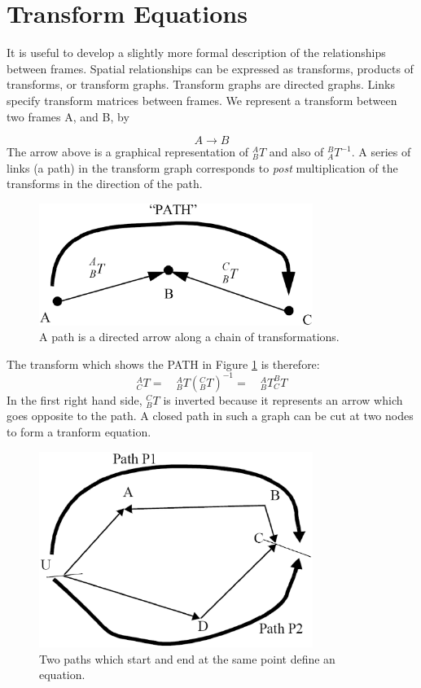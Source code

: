 \section{Transform Equations}

It is useful to develop a slightly more formal description of the relationships
between frames.
Spatial relationships can be expressed as transforms, products of
transforms, or transform graphs. Transform graphs are directed
graphs. Links specify transform matrices between frames. We represent
a transform between two frames A, and B, by

\[
A \to B
\]
The arrow above is a graphical representation of $^A_BT$ and also of $^B_AT^{-1}$.
A series of links (a path) in the transform graph corresponds to {\it post}
multiplication of the transforms in the direction of the path.

\begin{figure}[h]\centering
\includegraphics[width=3.5in]{figs02/abgraph.eps}
\caption{A path is  a directed arrow along a chain of transformations.}\label{PATH}
\end{figure}

The transform which shows the PATH in Figure \ref{PATH} is therefore:
\[
^A_CT = \quad ^A_BT(^C_BT)^{-1} = \quad ^A_BT^B_CT
\]
In the first right hand side, $^C_BT$ is inverted because it represents an arrow which goes opposite to the  path.
A closed path in such a graph can be cut at two nodes to form a tranform equation.

\begin{figure}[h]\centering
\includegraphics[width=3.5in]{figs02/xformgraph.eps}
\caption{Two paths which start and end at the same point define an equation.}\label{PATHequation}
\end{figure}

